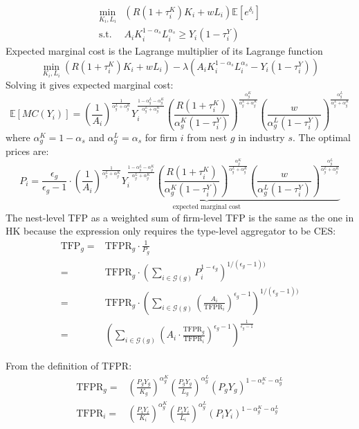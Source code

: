 \documentclass[12pt]{article}
\newcommand{\E}{\mathbb{E}} %
\begin{document}
\begin{align*}
\min\limits_{K_i,L_i} &(R(1+\tau_i^K)K_i+wL_i)\E[e^{\delta_i}]\\
\text{s.t. } & A_iK_i^{1-\alpha_s}L_i^{\alpha_s}\geq Y_i(1-\tau_i^Y)
\end{align*}
Expected marginal cost is the Lagrange multiplier of its Lagrange function 
$$\min\limits_{K_i,L_i} (R(1+\tau_i^K)K_i+wL_i)-\lambda (A_iK_i^{1-\alpha_s}L_i^{\alpha_s}- Y_i(1-\tau_i^Y))$$
Solving it gives expected marginal cost:
$$\E[MC(Y_i)]=\left( \frac{1}{A_i} \right)^{\frac{1}{\alpha_g^L+\alpha_g^K}}Y_i^{\frac{1-\alpha_g^L-\alpha_g^K}{\alpha_g^L+\alpha_g^K}}\left( \frac{R(1+\tau_i^K)}{\alpha_g^K(1-\tau_i^Y)} \right)^{\frac{\alpha_g^K}{\alpha_g^L+\alpha_g^K}}\left( \frac{w}{\alpha_g^L(1-\tau_i^Y)} \right)^{\frac{\alpha_g^L}{\alpha_g^L+\alpha_g^K}}$$ 
where $\alpha_g^K=1-\alpha_s$ and $\alpha_g^L=\alpha_s$ for firm $i$ from nest $g$ in industry $s$. The optimal prices are:
$$P_{i}=\frac{\epsilon_g}{\epsilon_g-1} \cdot \underbrace{\left( \frac{1}{A_i} \right)^{\frac{1}{\alpha_g^L+\alpha_g^K}}Y_i^{\frac{1-\alpha_g^L-\alpha_g^K}{\alpha_g^L+\alpha_g^K}}\left( \frac{R(1+\tau_i^K)}{\alpha_g^K(1-\tau_i^Y)} \right)^{\frac{\alpha_g^K}{\alpha_g^L+\alpha_g^K}}\left( \frac{w}{\alpha_g^L(1-\tau_i^Y)} \right)^{\frac{\alpha_g^L}{\alpha_g^L+\alpha_g^K}}}_{\text{expected marginal cost}}$$ 
The nest-level TFP as a weighted sum of firm-level TFP is the same as the one in HK because the expression only requires the type-level aggregator to be CES:
\begin{align}
\text{TFP}_g=&\text{TFPR}_g\cdot \frac{1}{P_g} \nonumber\\
=&\text{TFPR}_g \cdot \left(\sum_{i \in \mathcal{G}(g)}P_{i}^{1-\epsilon_g} \right)^{1/(\epsilon_g-1))}\nonumber\\
=&\text{TFPR}_g \cdot \left(\sum_{i \in \mathcal{G}(g)}\left( \frac{A_i}{\text{TFPR}_i} \right)^{\epsilon_g-1} \right)^{1/(\epsilon_g-1))}\nonumber\\
=&\left( \sum_{i \in \mathcal{G}(g)}\left( A_i \cdot \frac{\text{TFPR}_g}{\text{TFPR}_i} \right)^{\epsilon_g-1} \right)^{\frac{1}{\epsilon_g-1}}\label{AEq:TFPg}
\end{align}

From the definition of TFPR:
\begin{align*}
\text{TFPR}_g=&\left( \frac{P_gY_g}{K_g} \right)^{\alpha^K_g}\left( \frac{P_gY_g}{L_g} \right)^{\alpha^L_g}(P_gY_g)^{1-\alpha^K_s-\alpha^L_g}\\
\text{TFPR}_i=&\left( \frac{P_iY_i}{K_i} \right)^{\alpha^K_g}\left( \frac{P_iY_i}{L_i} \right)^{\alpha^L_g}(P_iY_i)^{1-\alpha^K_g-\alpha^L_g}
\end{align*}
\end{document}
